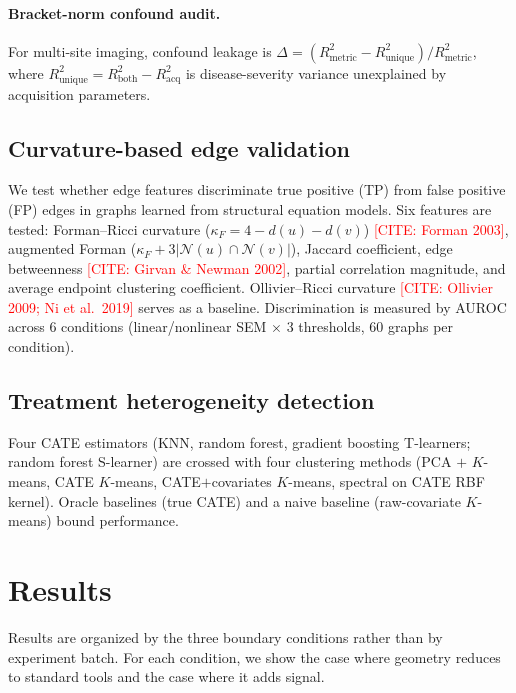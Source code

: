 \documentclass[11pt]{article}
\newcommand{\misscite}[1]{\textcolor{red}{[CITE: #1]}}
\begin{document}
\paragraph{Bracket-norm confound audit.}
For multi-site imaging, confound leakage is $\Delta = (R^2_{\mathrm{metric}} - R^2_{\mathrm{unique}}) / R^2_{\mathrm{metric}}$, where $R^2_{\mathrm{unique}} = R^2_{\mathrm{both}} - R^2_{\mathrm{acq}}$ is disease-severity variance unexplained by acquisition parameters.

\subsection{Curvature-based edge validation}
\label{sec:meth-curvature}

We test whether edge features discriminate true positive (TP) from false positive (FP) edges in graphs learned from structural equation models.
Six features are tested: Forman--Ricci curvature ($\kappa_F = 4 - d(u) - d(v)$) \misscite{Forman 2003}, augmented Forman ($\kappa_F + 3|\mathcal{N}(u) \cap \mathcal{N}(v)|$), Jaccard coefficient, edge betweenness \misscite{Girvan \& Newman 2002}, partial correlation magnitude, and average endpoint clustering coefficient.
Ollivier--Ricci curvature \misscite{Ollivier 2009; Ni et al.\ 2019} serves as a baseline.
Discrimination is measured by AUROC across 6 conditions (linear/nonlinear SEM $\times$ 3 thresholds, 60 graphs per condition).

\subsection{Treatment heterogeneity detection}
\label{sec:meth-hte}

Four CATE estimators (KNN, random forest, gradient boosting T-learners; random forest S-learner) are crossed with four clustering methods (PCA $+$ $K$-means, CATE $K$-means, CATE$+$covariates $K$-means, spectral on CATE RBF kernel).
Oracle baselines (true CATE) and a naive baseline (raw-covariate $K$-means) bound performance.

\section{Results}
\label{sec:results}

Results are organized by the three boundary conditions rather than by experiment batch.
For each condition, we show the case where geometry reduces to standard tools and the case where it adds signal.
\end{document}
